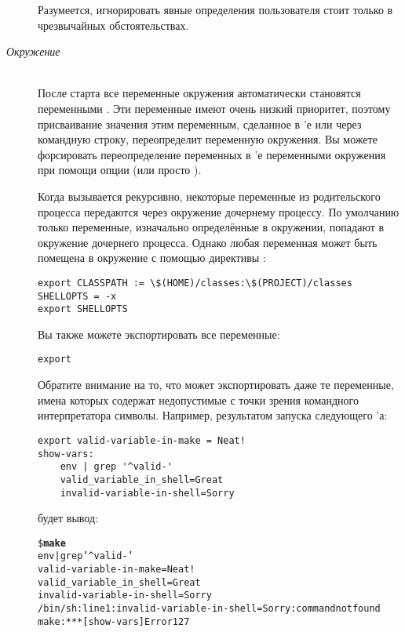 \begin{description}
Разумеется, игнорировать явные определения пользователя стоит только в
чрезвычайных обстоятельствах.
\item[\emph{Окружение}] \hfill \\
После старта \GNUmake{} все переменные окружения автоматически
становятся переменными \GNUmake{}. Эти переменные имеют очень низкий
приоритет, поэтому присваивание значения этим переменным, сделанное в
\Makefile{}'е или через командную строку, переопределит переменную
окружения. Вы можете форсировать переопределение переменных в
\Makefile{}'е переменными окружения при помощи опции
 (или просто ).

Когда \GNUmake{} вызывается рекурсивно, некоторые переменные из
родительского процесса \GNUmake{} передаются через окружение дочернему
процессу. По умолчанию только переменные, изначально определённые в
окружении, попадают в окружение дочернего процесса. Однако любая
переменная может быть помещена в окружение с помощью директивы
:

{\footnotesize
\begin{verbatim}
export CLASSPATH := \$(HOME)/classes:\$(PROJECT)/classes
SHELLOPTS = -x
export SHELLOPTS
\end{verbatim}
}

Вы также можете экспортировать все переменные:

{\footnotesize
\begin{verbatim}
export
\end{verbatim}
}

Обратите внимание на то, что \GNUmake{} может экспортировать даже те
переменные, имена которых содержат недопустимые с точки зрения
командного интерпретатора символы.  Например, результатом запуска
следующего \Makefile{}'а:

{\footnotesize
\begin{verbatim}
export valid-variable-in-make = Neat!
show-vars:
    env | grep '^valid-'
    valid_variable_in_shell=Great
    invalid-variable-in-shell=Sorry
\end{verbatim}
}

{\flushleft будет вывод:}

{\footnotesize
\begin{alltt}
\$ \textbf{make}
env | grep '\^{}valid-'
valid-variable-in-make=Neat!
valid\_variable\_in\_shell=Great
invalid-variable-in-shell=Sorry
/bin/sh: line 1: invalid-variable-in-shell=Sorry: command not found
make: *** [show-vars] Error 127
\end{alltt}
}


\end{description}
